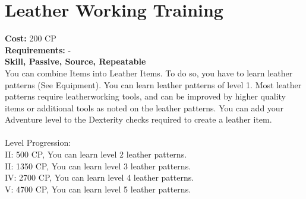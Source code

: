\section{Leather Working Training}
\textbf{Cost:} 200 CP\\
\textbf{Requirements:} -\\
\textbf{Skill, Passive, Source, Repeatable}\\
You can combine Items into Leather Items. To do so, you have to learn leather patterns (See Equipment). You can learn leather patterns of level 1. Most leather patterns require leatherworking tools, and can be improved by higher quality items or additional tools as noted on the leather patterns. You can add your Adventure level to the Dexterity checks required to create a leather item.\\
\\
Level Progression:\\
II: 500 CP, You can learn level 2 leather patterns.\\
II: 1350 CP, You can learn level 3 leather patterns.\\
IV: 2700 CP, You can learn level 4 leather patterns.\\
V: 4700 CP, You can learn level 5 leather patterns.\\